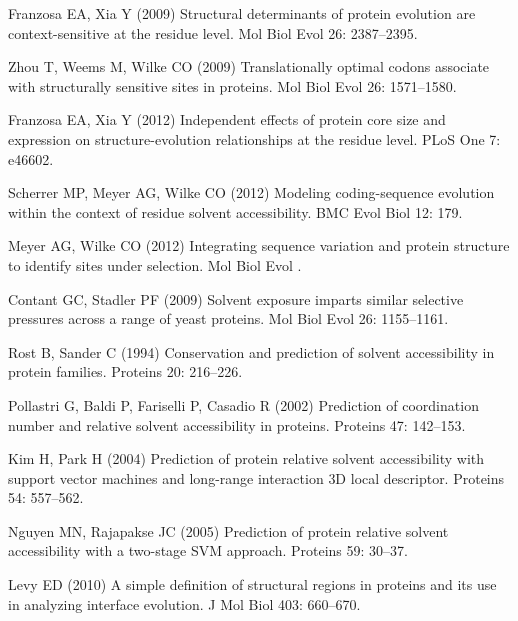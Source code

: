 \documentclass[11pt]{article}
\begin{document}
\begin{thebibliography}{10}
Franzosa EA, Xia Y (2009) Structural determinants of protein evolution are
  context-sensitive at the residue level.
\newblock Mol Biol Evol 26: 2387--2395.

Zhou T, Weems M, Wilke CO (2009) Translationally optimal codons associate with
  structurally sensitive sites in proteins.
\newblock Mol Biol Evol 26: 1571--1580.

Franzosa EA, Xia Y (2012) Independent effects of protein core size and
  expression on structure-evolution relationships at the residue level.
\newblock PLoS One 7: e46602.

Scherrer MP, Meyer AG, Wilke CO (2012) Modeling coding-sequence evolution
  within the context of residue solvent accessibility.
\newblock BMC Evol Biol 12: 179.

Meyer AG, Wilke CO (2012) Integrating sequence variation and protein structure
  to identify sites under selection.
\newblock Mol Biol Evol .

Contant GC, Stadler PF (2009) Solvent exposure imparts similar selective
  pressures across a range of yeast proteins.
\newblock Mol Biol Evol 26: 1155--1161.

Rost B, Sander C (1994) Conservation and prediction of solvent accessibility in
  protein families.
\newblock Proteins 20: 216--226.

Pollastri G, Baldi P, Fariselli P, Casadio R (2002) Prediction of coordination
  number and relative solvent accessibility in proteins.
\newblock Proteins 47: 142--153.

Kim H, Park H (2004) Prediction of protein relative solvent accessibility with
  support vector machines and long-range interaction {3D} local descriptor.
\newblock Proteins 54: 557--562.

Nguyen MN, Rajapakse JC (2005) Prediction of protein relative solvent
  accessibility with a two-stage {SVM} approach.
\newblock Proteins 59: 30--37.

Levy ED (2010) A simple definition of structural regions in proteins and its
  use in analyzing interface evolution.
\newblock J Mol Biol 403: 660--670.


\end{thebibliography}
\end{document}
